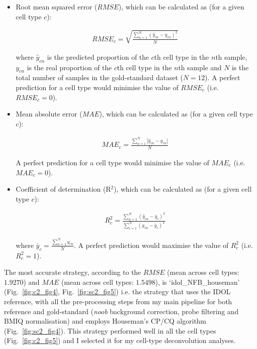 \begin{itemize}
	
	\item Root mean squared error ($RMSE$), which can be calculated as (for a given cell type $c$):
	
	\begin{align}
	RMSE_c = \sqrt{\frac{\sum_{n=1}^{N} (\hat{y}_{cn} - y_{cn})^2}{N}}
	\end{align}
	
	where $\hat{y}_{cn}$ is the predicted proportion of the $c$th cell type in the $n$th sample, $y_{cn}$ is the real proportion of the $c$th cell type in the $n$th sample and $N$ is the total number of samples in the gold-standard dataset ($N=12$). A perfect prediction for a cell type would minimise the value of $RMSE_c$ (i.e. $RMSE_c = 0$).
	
	\item Mean absolute error ($MAE$), which can be calculated as (for a given cell type $c$):
	
	\begin{align}
	MAE_c = \frac{\sum_{n=1}^{N} |\hat{y}_{cn} - y_{cn}|}{N}
	\end{align}
	
	A perfect prediction for a cell type would minimise the value of $MAE_c$ (i.e. $MAE_c = 0$).
	
	\item Coefficient of determination (R$^2$), which can be calculated as (for a given cell type $c$):
	
	\begin{align}
	R^2_c = \frac{\sum_{n=1}^{N} (\hat{y}_{cn} - \bar{y}_c)^2}{\sum_{i=1}^{N} (y_{cn} - \bar{y}_c)^2}
	\end{align}
	
	where $\bar{y}_c = \frac{\sum_{n=1}^{N} y_{cn}}{N}$. A perfect prediction would maximise the value of $R^2_c$ (i.e. $R^2_c=1$).
	
\end{itemize}


The most accurate strategy, according to the $RMSE$ (mean across cell types: $1.9270$) and $MAE$ (mean across cell types: $1.5498$), is `idol\_NFB\_houseman' (Fig.~\ref{fig:c2_fig4}, Fig.~\ref{fig:sc2_fig5}) i.e. the strategy that uses the IDOL reference, with all the pre-processing steps from my main pipeline for both reference and gold-standard (\textit{noob} background correction, probe filtering and BMIQ normalisation) and employs Houseman's CP/CQ algorithm (Fig.~\ref{fig:sc2_fig4}). This strategy performed well in all the cell types (Fig.~\ref{fig:c2_fig5}) and I selected it for my cell-type deconvolution analyses. 

